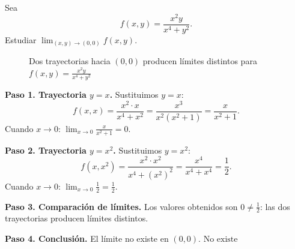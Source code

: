 \begin{example}
Sea
\[
f(x,y) = \frac{x^2 y}{x^4 + y^2}.
\]
Estudiar $\lim_{(x,y)\to(0,0)} f(x,y)$.

\begin{figure}[!htbp]
\centering
{}
\caption{Dos trayectorias hacia $(0,0)$ producen límites distintos
         para $f(x,y)=\tfrac{x^2y}{x^4+y^2}$}
\label{fig:trayectorias_limite}
\end{figure}

\begin{myproof}
\textbf{Paso 1. Trayectoria $y=x$.} Sustituimos $y=x$:
\[
f(x,x) = \frac{x^2\cdot x}{x^4+x^2} = \frac{x^3}{x^2(x^2+1)}
        = \frac{x}{x^2+1}.
\]
Cuando $x\to 0$: $\displaystyle\lim_{x\to 0}\frac{x}{x^2+1} = 0$.

\textbf{Paso 2. Trayectoria $y=x^2$.} Sustituimos $y=x^2$:
\[
f(x,x^2) = \frac{x^2\cdot x^2}{x^4+(x^2)^2}
          = \frac{x^4}{x^4+x^4} = \frac{1}{2}.
\]
Cuando $x\to 0$: $\displaystyle\lim_{x\to 0}\frac{1}{2} = \frac{1}{2}$.

\textbf{Paso 3. Comparación de límites.} Los valores obtenidos son
$0\neq\tfrac{1}{2}$: las dos trayectorias producen límites distintos.

\textbf{Paso 4. Conclusión.} El límite no existe en $(0,0)$.
$\boxed{\text{No existe}}$
\end{myproof}
\end{example}

